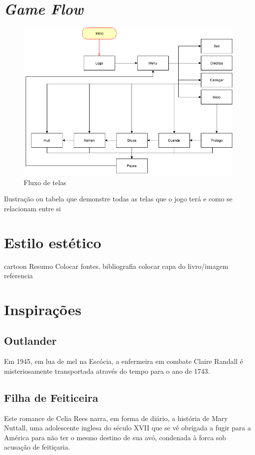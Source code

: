 \section{\textit{Game Flow}}
\begin{figure}[htb]
	\caption{\label{fig_grafico}Fluxo de telas}
	\begin{center}
	    \includegraphics[width=\textwidth]{imagens/Flow.png}
	\end{center}
\end{figure}
Ilustração ou tabela que demonstre todas as telas que o jogo terá e como se relacionam entre si

\section{Estilo estético}

cartoon Resumo
Colocar fontes, bibliografia colocar capa do livro/imagem referencia

\section{Inspirações}
\subsection{Outlander}
Em 1945, em lua de mel na Escócia, a enfermeira em combate Claire Randall é misteriosamente transportada através do tempo para o ano de 1743.

\subsection{Filha de Feiticeira}
Este romance de Celia Rees narra, em forma de diário, a história de Mary Nuttall, uma adolescente inglesa do século XVII que se vê obrigada a fugir para a América para não ter o mesmo destino de sua avó, condenada à forca sob acusação de feitiçaria.

